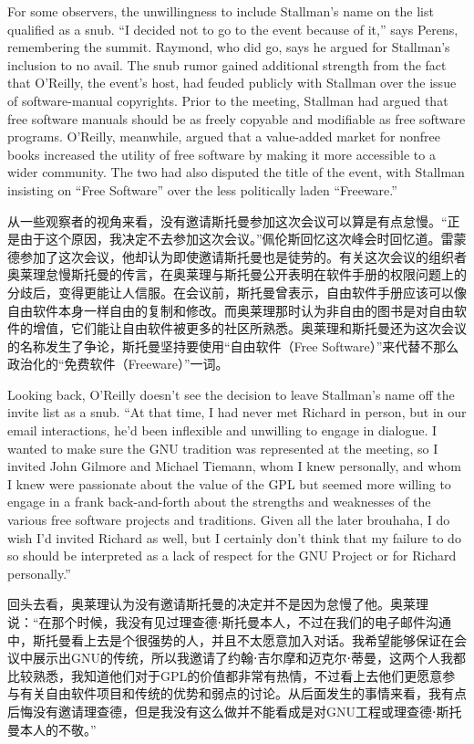 \ifdefined\eng
For some observers, the unwillingness to include Stallman's name on the list qualified as a snub. ``I decided not to go to the event because of it,'' says Perens, remembering the summit. Raymond, who did go, says he argued for Stallman's inclusion to no avail. The snub rumor gained additional strength from the fact that O'Reilly, the event's host, had feuded publicly with Stallman over the issue of software-manual copyrights. Prior to the meeting, Stallman had argued that free software manuals should be as freely copyable and modifiable as free software programs. O'Reilly, meanwhile, argued that a value-added market for nonfree books increased the utility of free software by making it more accessible to a wider community. The two had also disputed the title of the event, with Stallman insisting on ``Free Software'' over the less politically laden ``Freeware.''
\fi

\ifdefined\chs
从一些观察者的视角来看，没有邀请斯托曼参加这次会议可以算是有点怠慢。``正是由于这个原因，我决定不去参加这次会议。''佩伦斯回忆这次峰会时回忆道。雷蒙德参加了这次会议，他却认为即使邀请斯托曼也是徒劳的。有关这次会议的组织者奥莱理怠慢斯托曼的传言，在奥莱理与斯托曼公开表明在软件手册的权限问题上的分歧后，变得更能让人信服。在会议前，斯托曼曾表示，自由软件手册应该可以像自由软件本身一样自由的复制和修改。而奥莱理那时认为非自由的图书是对自由软件的增值，它们能让自由软件被更多的社区所熟悉。奥莱理和斯托曼还为这次会议的名称发生了争论，斯托曼坚持要使用``自由软件（Free Software）''来代替不那么政治化的``免费软件（Freeware）''一词。
\fi

\ifdefined\eng
Looking back, O'Reilly doesn't see the decision to leave Stallman's name off the invite list as a snub. ``At that time, I had never met Richard in person, but in our email interactions, he'd been inflexible and unwilling to engage in dialogue. I wanted to make sure the GNU tradition was represented at the meeting, so I invited John Gilmore and Michael Tiemann, whom I knew personally, and whom I knew were passionate about the value of the GPL but seemed more willing to engage in a frank back-and-forth about the strengths and weaknesses of the various free software projects and traditions. Given all the later brouhaha, I do wish I'd invited Richard as well, but I certainly don't think that my failure to do so should be interpreted as a lack of respect for the GNU Project or for Richard personally.''
\fi

\ifdefined\chs
回头去看，奥莱理认为没有邀请斯托曼的决定并不是因为怠慢了他。奥莱理说：``在那个时候，我没有见过理查德⋅斯托曼本人，不过在我们的电子邮件沟通中，斯托曼看上去是个很强势的人，并且不太愿意加入对话。我希望能够保证在会议中展示出GNU的传统，所以我邀请了约翰⋅吉尔摩和迈克尔⋅蒂曼，这两个人我都比较熟悉，我知道他们对于GPL的价值都非常有热情，不过看上去他们更愿意参与有关自由软件项目和传统的优势和弱点的讨论。从后面发生的事情来看，我有点后悔没有邀请理查德，但是我没有这么做并不能看成是对GNU工程或理查德⋅斯托曼本人的不敬。''
\fi

